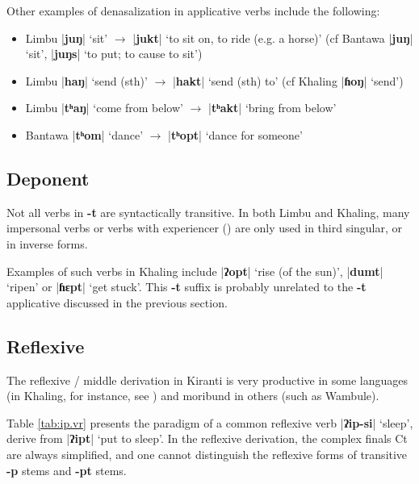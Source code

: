 \documentclass[oneside,a4paper,11pt]{article}
\newcommand{\ipa}[1]{\textbf{{\phon\mbox{#1}}}} %
\newcommand{\dhatu}[2]{|\ipa{#1}| `#2'}
\begin{document}
Other examples of denasalization in applicative verbs include the following:

\begin{itemize}
\item Limbu \dhatu{juŋ}{sit} $\rightarrow $ \dhatu{jukt}{to sit on, to ride (e.g. a horse)} (cf Bantawa \dhatu{juŋ}{sit}, \dhatu{juŋs}{to put; to cause to sit})
\item Limbu \dhatu{haŋ}{send (sth)} $\rightarrow $ \dhatu{hakt}{send (sth) to} (cf Khaling \dhatu{ɦoŋ}{send})
\item Limbu \dhatu{tʰaŋ}{come from below} $\rightarrow $ \dhatu{tʰakt}{bring from below}
\item Bantawa \dhatu{tʰom}{dance} $\rightarrow $ \dhatu{tʰopt}{dance for someone}
\end{itemize}
 
\subsection{Deponent} \label{sec:deponent}
Not all verbs in \ipa{-t} are syntactically transitive. In both Limbu and Khaling, many impersonal verbs or verbs with experiencer (\citealt{michailovsky97deponent}) are only used in third singular, or in inverse forms.  

Examples of such verbs in Khaling include \dhatu{ʔopt}{rise (of the sun)},  \dhatu{dumt}{ripen} or \dhatu{ɦɛpt}{get stuck}. This \ipa{-t} suffix is probably unrelated to the \ipa{-t} applicative discussed in the previous section. 

\subsection{Reflexive} \label{sec:refl}
The reflexive / middle derivation in Kiranti is very productive in some languages (in Khaling, for instance, see \citealt{jacques16si}) and moribund in others (such as Wambule). 


Table \ref{tab:ip.vr} presents the paradigm of a common reflexive verb \dhatu{ʔip-si}{sleep}, derive from \dhatu{ʔipt}{put to sleep}. In the reflexive derivation, the complex finals Ct are always simplified, and one cannot distinguish the reflexive forms of transitive \ipa{-p} stems and \ipa{-pt} stems.
\end{document}
